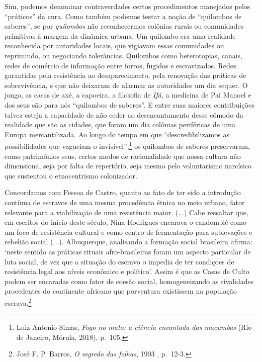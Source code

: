 Sim, podemos denominar contraverdades certos procedimentos manejados
pelos ``práticos'' da cura. Como também podemos testar a noção de
``quilombos de saberes'', se por \emph{quilombos} não reconhecermos
colônias rurais ou comunidades primitivas à margem da dinâmica urbana.
Um quilombo era uma realidade reconhecida por autoridades locais, que
vigiavam essas comunidades ou reprimindo, ou negociando tolerâncias.
Quilombos como heterotopias, canais, redes de comércio de informação
entre forros, fugidos e escravizados. Redes garantidas pela resistência
ao desaparecimento, pela renovação das práticas de sobrevivência, e que
não deixaram de alarmar as autoridades um dia sequer. O jongo, as casas
de axé, a capoeira, a filosofia de \emph{Ifá}, a medicina de Pai Manoel
e dos seus são para nós ``quilombos de saberes''. E entre suas maiores
contribuições talvez esteja a capacidade de não ceder ao desencantamento
desse cômodo da realidade que são as cidades, que foram um dia colônias
periféricas de uma Europa mercantilizada. Ao longo do tempo em que
``descredibilizamos as possibilidades que vagueiam o
invisível'',\footnote{Luiz Antonio Simas, \emph{Fogo no mato: a ciência
  encantada das macumbas} (Rio de Janeiro, Mórula, 2018), p.~105.} os
quilombos de saberes preservaram, como patrimônios seus, certos modos de
racionalidade que nossa cultura não dimensiona, seja por falta de
repertório, seja mesmo pelo voluntarismo narcísico que sustentou o
etnocentrismo colonizador.

Concordamos com Pessoa de Castro, quanto ao fato de ter sido a
introdução contínua de escravos de uma mesma procedência étnica no meio
urbano, fator relevante para a viabilização de uma resistência maior.
(...) Cabe ressaltar que, em escritos do início deste século, Nina
Rodrigues encarava o candomblé como um foco de resistência cultural e
como centro de fermentação para sublevações e rebelião social (...).
Albuquerque, analisando a formação social brasileira afirma: `neste
sentido as práticas rituais afro-brasileiras foram um aspecto particular
de luta social, de vez que a situação do escravo o impedia de ter
condiçoes de resistência legal aos níveis econômico e político'. Assim é
que as Casas de Culto podem ser encaradas como fator de coesão social,
homogeneizando as rivalidades procedentes do continente africano que
porventura existissem na população escrava.\footnote{José F. P. Barros,
  \emph{O segredo das folhas}, 1993 , p.~12-3.}

